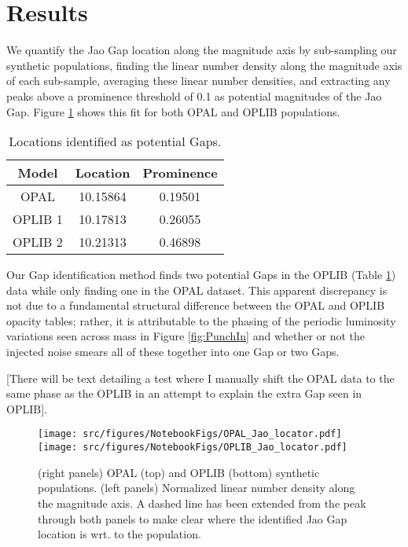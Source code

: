 \section{Results}\label{sec:results}
We quantify the Jao Gap location along the magnitude axis by sub-sampling our
synthetic populations, finding the linear number density along the magnitude
axis of each sub-sample, averaging these linear number densities, and
extracting any peaks above a prominence threshold of 0.1 as potential
magnitudes of the Jao Gap. Figure \ref{fig:JaoGapLocator} shows this fit for
both OPAL and OPLIB populations.

\begin{table}
	\centering
	\begin{tabular}{c | c c}
		\hline
		Model & Location & Prominence \\
		\hline
		\hline
		OPAL & 10.15864 & 0.19501 \\
		OPLIB 1 & 10.17813 & 0.26055 \\
		OPLIB 2 & 10.21313 & 0.46898
	\end{tabular}
	\caption{Locations identified as potential Gaps.}
	\label{tab:GapLocation}
\end{table}

Our Gap identification method finds two potential Gaps in the OPLIB (Table
\ref{tab:GapLocation}) data while only finding one in the OPAL dataset. This
apparent discrepancy is not due to a fundamental structural difference between
the OPAL and OPLIB opacity tables; rather, it is attributable to the
phasing of the periodic luminosity variations seen across mass in Figure
\ref{fig:PunchIn} and whether or not the
injected noise smears all of these together into one Gap or two Gaps.

{\color{red} [There will be text detailing a test where I manually shift the
OPAL data to the same phase as the OPLIB in an attempt to explain the extra Gap
seen in OPLIB]}.

\begin{figure}
	\centering
	\texttt{[image: src/figures/NotebookFigs/OPAL\_Jao\_locator.pdf]}
	\texttt{[image: src/figures/NotebookFigs/OPLIB\_Jao\_locator.pdf]}
	\caption{(right panels) OPAL (top) and OPLIB (bottom) synthetic
	populations. (left panels) Normalized linear number density along the
	magnitude axis. A dashed line has been extended from the peak through both
	panels to make clear where the identified Jao Gap location is wrt. to the
	population. }
	\label{fig:JaoGapLocator}
\end{figure}

